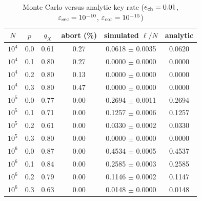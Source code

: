 \begin{table}[!t]
\caption{Monte Carlo versus analytic key rate ($e_{\mathrm{ch}}=0.01$, $\varepsilon_{\mathrm{sec}}=10^{-10}$, $\varepsilon_{\mathrm{cor}}=10^{-15}$)}
\label{tab:mc}
\centering
\small
\begin{tabular}{@{}cccccc@{}}
\toprule
$N$ & $p$ & $q_X$ & abort (\%) & simulated $\ell/N$ & analytic \\
\midrule
$10^{4}$ & 0.0 & 0.61 & 0.27 & 0.0618 $\pm$ 0.0035 & 0.0620 \\
$10^{4}$ & 0.1 & 0.80 & 0.27 & 0.0000 $\pm$ 0.0000 & 0.0000 \\
$10^{4}$ & 0.2 & 0.80 & 0.13 & 0.0000 $\pm$ 0.0000 & 0.0000 \\
$10^{4}$ & 0.3 & 0.80 & 0.47 & 0.0000 $\pm$ 0.0000 & 0.0000 \\
$10^{5}$ & 0.0 & 0.77 & 0.00 & 0.2694 $\pm$ 0.0011 & 0.2694 \\
$10^{5}$ & 0.1 & 0.71 & 0.00 & 0.1257 $\pm$ 0.0006 & 0.1257 \\
$10^{5}$ & 0.2 & 0.61 & 0.00 & 0.0330 $\pm$ 0.0002 & 0.0330 \\
$10^{5}$ & 0.3 & 0.80 & 0.00 & 0.0000 $\pm$ 0.0000 & 0.0000 \\
$10^{6}$ & 0.0 & 0.87 & 0.00 & 0.4534 $\pm$ 0.0005 & 0.4537 \\
$10^{6}$ & 0.1 & 0.84 & 0.00 & 0.2585 $\pm$ 0.0003 & 0.2585 \\
$10^{6}$ & 0.2 & 0.79 & 0.00 & 0.1146 $\pm$ 0.0002 & 0.1147 \\
$10^{6}$ & 0.3 & 0.63 & 0.00 & 0.0148 $\pm$ 0.0000 & 0.0148 \\
\bottomrule
\end{tabular}
\end{table}
